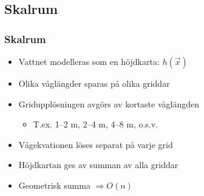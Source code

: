 \subsection{Skalrum}

\begin{frame}
\frametitle{Skalrum}

\begin{itemize}[<+(1)->]
\item Vattnet modelleras som en höjdkarta: $h(\vec{x})$
\item Olika våglängder sparas på olika griddar
\item Gridupplösningen avgörs av kortaste våglängden
    \begin{itemize}[<+(1)->]
    \item T.ex. 1--2 m, 2--4 m, 4--8 m, o.s.v.
    \end{itemize}
\item Vågekvationen löses separat på varje grid
\item Höjdkartan ges av summan av alla griddar
\item Geometrisk summa $\Rightarrow O(n)$
\end{itemize}

\end{frame}